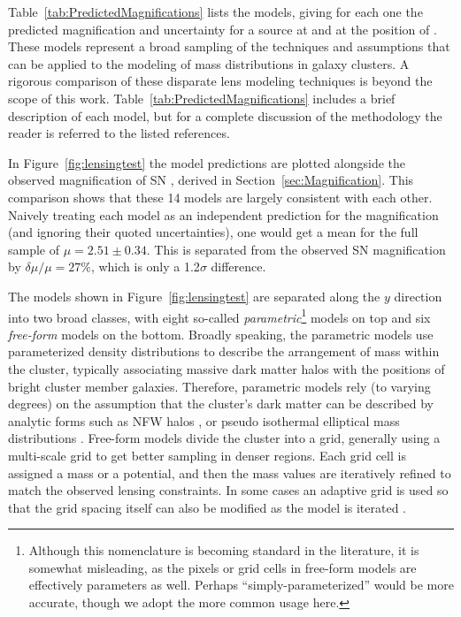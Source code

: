 Table~\ref{tab:PredictedMagnifications} lists the  models,
giving for each one the predicted magnification and uncertainty for a
source at  and at the position of \tomas.  These models
represent a broad sampling of the techniques and assumptions that can
be applied to the modeling of mass distributions in galaxy clusters. A
rigorous comparison of these disparate lens modeling techniques is
beyond the scope of this work. Table~\ref{tab:PredictedMagnifications}
includes a brief description of each model, but for a complete
discussion of the methodology the reader is referred to the listed
references.

In Figure~\ref{fig:lensingtest} the model predictions are plotted
alongside the observed magnification of SN \tomas, derived in
Section~\ref{sec:Magnification}.  This comparison shows that these 14
models are largely consistent with each other. Naively treating each
model as an independent prediction for the magnification (and ignoring
their quoted uncertainties), one would get a mean for the full sample
of $\mu=2.51\pm0.34$.  This is separated from the observed SN
magnification by $\delta\mu/\mu=27\%$, which is only a 1.2$\sigma$
difference.

The models shown in Figure~\ref{fig:lensingtest} are separated along
the $y$ direction into two broad classes, with eight so-called {\it
parametric}\footnote{Although this nomenclature is becoming standard
in the literature, it is somewhat misleading, as the pixels or grid
cells in free-form models are effectively parameters as well. Perhaps
``simply-parameterized'' would be more accurate, though we adopt the
more common usage here.}  models on top and six {\it free-form} models
on the bottom.  Broadly speaking, the parametric models use
parameterized density distributions to describe the arrangement of
mass within the cluster, typically associating massive dark matter
halos with the positions of bright cluster member galaxies. Therefore,
parametric models rely (to varying degrees) on the assumption that the
cluster's dark matter can be described by analytic forms such as NFW
halos \citep{Navarro:1997}, or pseudo isothermal elliptical mass
distributions \citep{Kassiola:1993}.  Free-form models divide the
cluster into a grid, generally using a
multi-scale grid to get better sampling in denser regions. Each grid cell
is assigned a mass or a potential, and then the mass values are
iteratively refined to match the observed lensing
constraints. In some cases an adaptive grid is used so
that the grid spacing itself can also be modified as the model is
iterated \citep[e.g.][]{Liesenborgs:2006,Merten:2009}.

